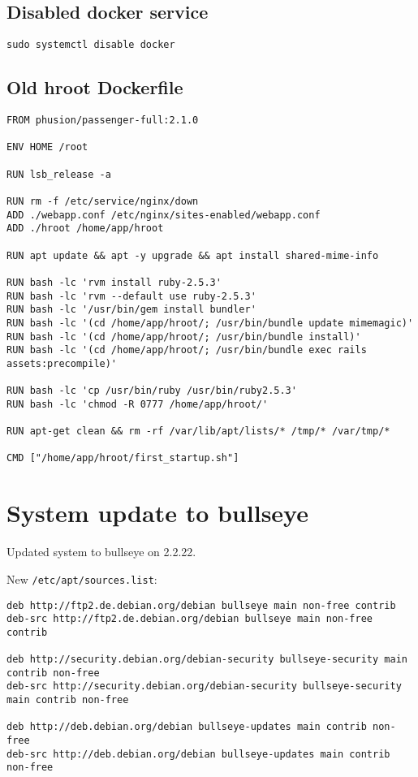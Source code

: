 \documentclass{article}
\begin{document}
\subsection{Disabled docker service}

\begin{lstlisting}
sudo systemctl disable docker
\end{lstlisting}

\subsection{Old hroot Dockerfile}
\begin{lstlisting}
FROM phusion/passenger-full:2.1.0

ENV HOME /root

RUN lsb_release -a

RUN rm -f /etc/service/nginx/down
ADD ./webapp.conf /etc/nginx/sites-enabled/webapp.conf
ADD ./hroot /home/app/hroot

RUN apt update && apt -y upgrade && apt install shared-mime-info

RUN bash -lc 'rvm install ruby-2.5.3'
RUN bash -lc 'rvm --default use ruby-2.5.3'
RUN bash -lc '/usr/bin/gem install bundler'
RUN bash -lc '(cd /home/app/hroot/; /usr/bin/bundle update mimemagic)'
RUN bash -lc '(cd /home/app/hroot/; /usr/bin/bundle install)'
RUN bash -lc '(cd /home/app/hroot/; /usr/bin/bundle exec rails assets:precompile)'

RUN bash -lc 'cp /usr/bin/ruby /usr/bin/ruby2.5.3'
RUN bash -lc 'chmod -R 0777 /home/app/hroot/'

RUN apt-get clean && rm -rf /var/lib/apt/lists/* /tmp/* /var/tmp/*

CMD ["/home/app/hroot/first_startup.sh"]
\end{lstlisting}

\section{System update to bullseye}

Updated system to bullseye on 2.2.22.

New \verb|/etc/apt/sources.list|:
\begin{lstlisting}
deb http://ftp2.de.debian.org/debian bullseye main non-free contrib
deb-src http://ftp2.de.debian.org/debian bullseye main non-free contrib

deb http://security.debian.org/debian-security bullseye-security main contrib non-free
deb-src http://security.debian.org/debian-security bullseye-security main contrib non-free

deb http://deb.debian.org/debian bullseye-updates main contrib non-free
deb-src http://deb.debian.org/debian bullseye-updates main contrib non-free

\end{lstlisting}
\end{document}
